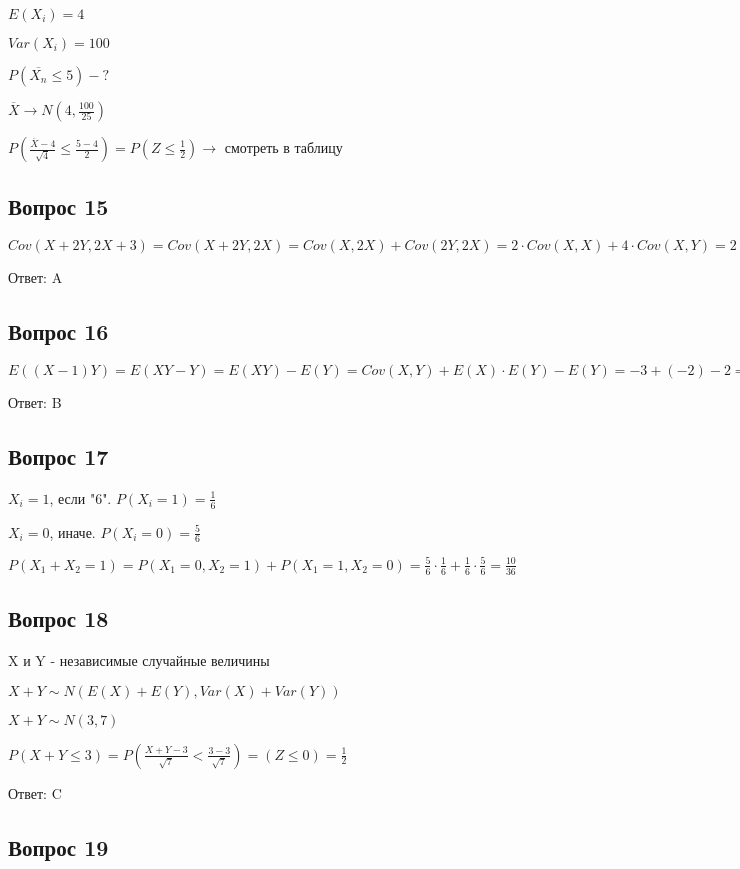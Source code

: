 \documentclass{article}
\begin{document}
\begin{flushleft}
$E(X_i) = 4$

$Var(X_i) = 100$

$P(\overline{X_n} \leq 5) - ?$

$\overline{X} \rightarrow N(4,\frac{100}{25})$

$P(\frac{\overline{X} - 4}{\sqrt{4}} \leq \frac{5-4}{2}) = P(Z\leq \frac{1}{2}) \rightarrow$ смотреть в таблицу

\subsection{Вопрос 15}

$Cov(X+2Y, 2X + 3) = Cov(X+2Y, 2X) = Cov(X, 2X) + Cov(2Y, 2X) = 2 \cdot Cov(X,X) + 4 \cdot Cov(X,Y) = 2 \cdot 4 + 4 \cdot (-3) = -4$

Ответ: A

\subsection{Вопрос 16}

$E((X-1)Y) = E(XY - Y) = E(XY) - E(Y) = Cov(X,Y) + E(X)\cdot E(Y) - E(Y) = -3 + (-2) - 2 = -7$

Ответ: B

\subsection{Вопрос 17}

$X_{i} = 1$, если "6". $P(X_{i} = 1) = \frac{1}{6}$

$X_{i} = 0$, иначе. $P(X_{i} = 0) = \frac{5}{6}$

$P(X_{1} + X_{2} = 1) = P(X_{1} = 0, X_{2} = 1) + P(X_{1} = 1, X_{2} = 0) = \frac{5}{6} \cdot \frac{1}{6} + \frac{1}{6} \cdot \frac{5}{6} = \frac{10}{36}$

\subsection{Вопрос 18}

X и Y - независимые случайные величины

$X + Y \sim N(E(X) + E(Y), Var(X) + Var(Y))$

$X + Y \sim N(3,7)$

$P(X + Y\leq 3) = P(\frac{X+Y-3}{\sqrt{7}} < \frac{3-3}{\sqrt{7}}) = (Z\leq 0) = \frac{1}{2}$

Ответ: C

\subsection{Вопрос 19}


\end{flushleft}
\end{document}
